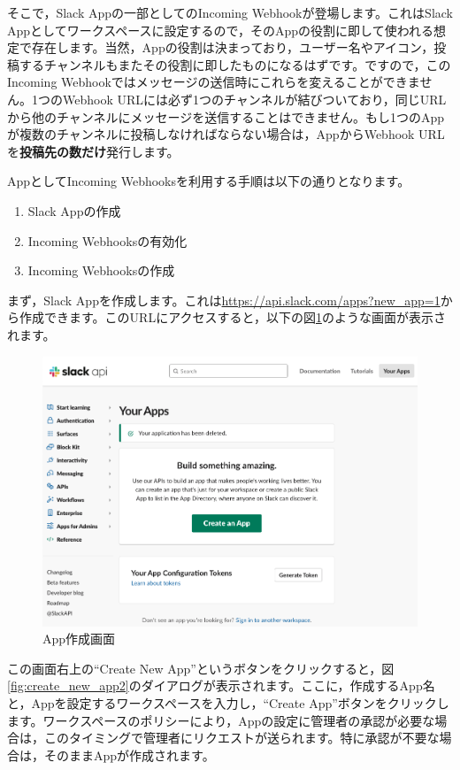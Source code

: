 \documentclass[uplatex,a4j]{jsarticle}
\begin{document}
そこで，Slack Appの一部としてのIncoming Webhookが登場します。これはSlack Appとしてワークスペースに設定するので，そのAppの役割に即して使われる想定で存在します。当然，Appの役割は決まっており，ユーザー名やアイコン，投稿するチャンネルもまたその役割に即したものになるはずです。ですので，このIncoming Webhookではメッセージの送信時にこれらを変えることができません。1つのWebhook URLには必ず1つのチャンネルが結びついており，同じURLから他のチャンネルにメッセージを送信することはできません。もし1つのAppが複数のチャンネルに投稿しなければならない場合は，AppからWebhook URLを\textbf{投稿先の数だけ}発行します。

AppとしてIncoming Webhooksを利用する手順は以下の通りとなります。

\begin{enumerate}
\item Slack Appの作成
\item Incoming Webhooksの有効化
\item Incoming Webhooksの作成
\end{enumerate}

まず，Slack Appを作成します。これは\href{https://api.slack.com/apps?new_app=1}{https://api.slack.com/apps?new\_app=1}から作成できます。このURLにアクセスすると，以下の図\ref{fig:create_new_app}のような画面が表示されます。

\begin{figure}[H]
 \centering
 \includegraphics[keepaspectratio, scale=0.45]{images/create_new_app.png}
 \caption{App作成画面}
 \label{fig:create_new_app}
\end{figure}

この画面右上の``Create New App''というボタンをクリックすると，図\ref{fig:create_new_app2}のダイアログが表示されます。ここに，作成するApp名と，Appを設定するワークスペースを入力し，``Create App''ボタンをクリックします。ワークスペースのポリシーにより，Appの設定に管理者の承認が必要な場合は，このタイミングで管理者にリクエストが送られます。特に承認が不要な場合は，そのままAppが作成されます。
\end{document}
